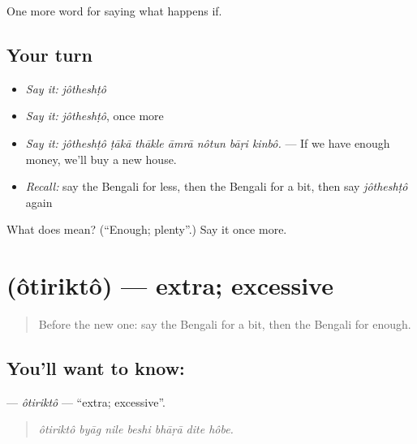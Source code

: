 \begin{grammarlens}[title={What you've built}]
One more word for saying what happens if.
\end{grammarlens}

\subsection*{Your turn}
\begin{itemize}
\raggedright
  \item \emph{Say it:} \emph{jôtheshṭô}
  \item \emph{Say it:} \emph{jôtheshṭô}, once more
  \item \emph{Say it:} \emph{jôtheshṭô ṭākā thākle āmrā nôtun bāṛi kinbô.} — If we have enough money, we'll buy a new house.
  \item \emph{Recall:} say the Bengali for less, then the Bengali for a bit, then say \emph{jôtheshṭô} again
\end{itemize}

\begin{tcolorbox}[breakable,colback=teal!4,colframe=teal!35!black,title={Before you move on}]
What does  mean? (\textquotedblleft{}Enough; plenty\textquotedblright{}.) Say it once more.
\end{tcolorbox}
\section[\texorpdfstring{\bn{অতিরিক্ত} (ôtiriktô)}{অতিরিক্ত (ôtiriktô)}]{ (ôtiriktô) — extra; excessive}

\label{lesson:BN-C371-otirikto}



\begin{quote}
Before the new one: say the Bengali for a bit, then the Bengali for enough.
\end{quote}

\subsection*{You'll want to know: }
\textbf{} — \emph{ôtiriktô} — \textquotedblleft{}extra; excessive\textquotedblright{}.

\begin{quote}
      
\end{quote}

\begin{quote}
\emph{ôtiriktô byāg nile beshi bhāṛā dite hôbe.}
\end{quote}

